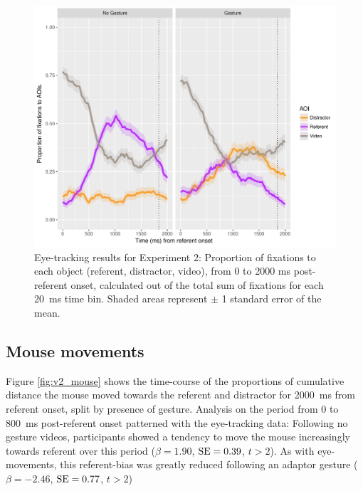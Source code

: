 \documentclass[a4paper,man,natbib]{apa6}
\newcommand{\resultsLM}[3]{$\beta = #1$, $\textnormal{SE} = #2$, $t #3$}
\begin{document}
\begin{figure}[Ht]
  \centering
	\includegraphics[width=\linewidth]{./img/e8_fixations.pdf}
  \caption{Eye-tracking results for Experiment 2: Proportion of fixations to each object (referent, distractor, video), from 0 to 2000 ms post-referent onset, calculated out of the total sum of fixations for each 20~ms time bin. Shaded areas represent $\pm$ 1 standard error of the mean.}
  \label{fig:v2_eye}
\end{figure}



\subsection{Mouse movements}
Figure \ref{fig:v2_mouse} shows the time-course of the proportions of cumulative distance the mouse moved towards the referent and distractor for 2000~ms from referent onset, split by presence of gesture.
Analysis on the period from 0 to 800~ms post-referent onset patterned with the eye-tracking data:
Following no gesture videos, participants showed a tendency to move the mouse increasingly towards referent over this period (\resultsLM{1.90}{0.39}{>2}).
As with eye-movements, this referent-bias was greatly reduced following an adaptor gesture (\resultsLM{-2.46}{0.77}{>2})
\end{document}

